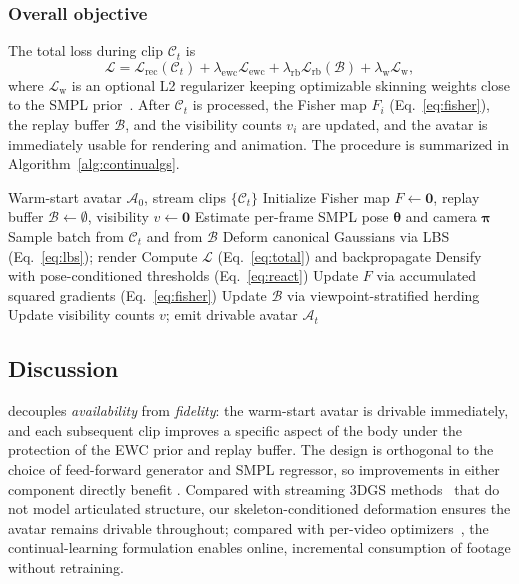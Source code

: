 \subsubsection{Overall objective}
The total loss during clip $\mathcal{C}_t$ is
\begin{equation}
  \mathcal{L} = \mathcal{L}_{\mathrm{rec}}(\mathcal{C}_t)
              + \lambda_{\mathrm{ewc}}\mathcal{L}_{\mathrm{ewc}}
              + \lambda_{\mathrm{rb}}\mathcal{L}_{\mathrm{rb}}(\mathcal{B})
              + \lambda_{\mathrm{w}}\mathcal{L}_{\mathrm{w}},
  \label{eq:total}
\end{equation}
where $\mathcal{L}_{\mathrm{w}}$ is an optional L2 regularizer keeping
optimizable skinning weights close to the SMPL prior~\cite{hu2024gauhuman}.
After $\mathcal{C}_t$ is processed, the Fisher map $F_i$ (Eq.~\eqref{eq:fisher}),
the replay buffer $\mathcal{B}$, and the visibility counts $v_i$ are
updated, and the avatar is immediately usable for rendering and animation.
The procedure is summarized in Algorithm~\ref{alg:continualgs}.

\begin{algorithm}[t]
\caption{\method{} continual refinement}
\label{alg:continualgs}
\begin{algorithmic}[1]
\Require Warm-start avatar $\mathcal{A}_0$, stream clips $\{\mathcal{C}_t\}$
\State Initialize Fisher map $F\!\leftarrow\!\bm{0}$, replay buffer $\mathcal{B}\!\leftarrow\!\emptyset$, visibility $v\!\leftarrow\!\bm{0}$
  \State Estimate per-frame SMPL pose $\bm{\theta}$ and camera $\bm{\pi}$
    \State Sample batch from $\mathcal{C}_t$ and from $\mathcal{B}$
    \State Deform canonical Gaussians via LBS (Eq.~\eqref{eq:lbs}); render
    \State Compute $\mathcal{L}$ (Eq.~\eqref{eq:total}) and backpropagate
    \State Densify with pose-conditioned thresholds (Eq.~\eqref{eq:react})
  \EndFor
  \State Update $F$ via accumulated squared gradients (Eq.~\eqref{eq:fisher})
  \State Update $\mathcal{B}$ via viewpoint-stratified herding
  \State Update visibility counts $v$; emit drivable avatar $\mathcal{A}_t$
\EndFor
\end{algorithmic}
\end{algorithm}

\subsection{Discussion}\label{sec:method:discussion}
\method{} decouples \emph{availability} from \emph{fidelity}: the
warm-start avatar is drivable immediately, and each subsequent clip
improves a specific aspect of the body under the protection of the EWC
prior and replay buffer. The design is orthogonal to the choice of
feed-forward generator and SMPL regressor, so improvements in either
component directly benefit \method{}. Compared with streaming 3DGS
methods~\cite{wu2025streamsplat,li2025streamgs} that do not model
articulated structure, our skeleton-conditioned deformation ensures the
avatar remains drivable throughout; compared with per-video
optimizers~\cite{hu2024gauhuman,hu2024gaussianavatar,qian2024gsavatar},
the continual-learning formulation enables online, incremental consumption
of footage without retraining.
